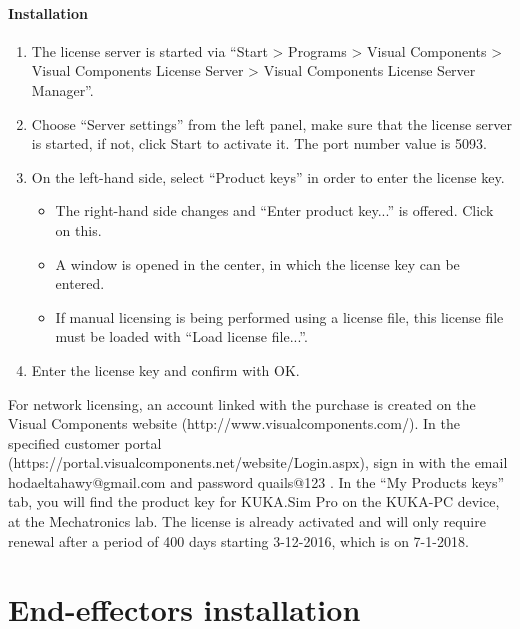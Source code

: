  				\paragraph{Installation}
 					\begin{enumerate}
 						\item The license server is started via “Start > Programs > Visual Components > Visual Components License Server > Visual Components License Server Manager”.
 						\item Choose “Server settings” from the left panel, make sure that the license server is started, if not, click Start to activate it. The port number value is 5093.
 						\item On the left-hand side, select “Product keys” in order to enter the license key.
 							\begin{itemize}
 								\item The right-hand side changes and “Enter product key...” is offered. Click on this.
 								\item A window is opened in the center, in which the license key can be entered.
 								\item If manual licensing is being performed using a license file, this license file must be loaded with “Load license file...”.
 							\end{itemize}
 						\item Enter the license key and confirm with OK.
 					\end{enumerate}
 				
 				For network licensing, an account linked with the purchase is created on the Visual Components website (http://www.visualcomponents.com/). In the specified customer portal (https://portal.visualcomponents.net/website/Login.aspx), sign in with the email hodaeltahawy@gmail.com and password quails@123 . In the “My Products keys” tab, you will find the product key for KUKA.Sim Pro on the KUKA-PC device, at the Mechatronics lab. The license is already activated and will only require renewal after a period of 400 days starting 3-12-2016, which is on 7-1-2018. 
	 
	 \newpage
	 \section{End-effectors installation}

